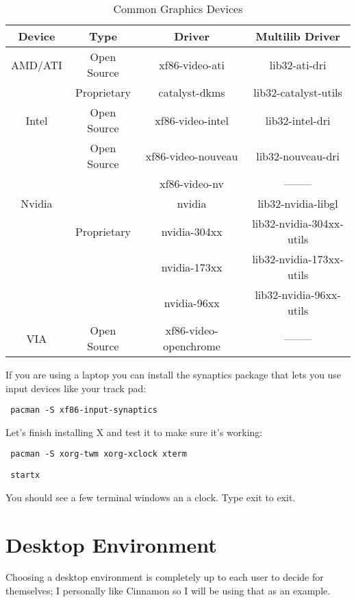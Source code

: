\documentclass[12pt]{article}
\begin{document}
    \begin{table}[H]
        \centering
        \caption{Common Graphics Devices}
        \label{graphics_drivers}
        \begin{tabular}{|c|c|c|c|} \hline
            Device & Type & Driver & Multilib Driver \\ \hline
            AMD/ATI & Open Source & xf86-video-ati & lib32-ati-dri \\ \cline{2-4}
             & Proprietary & catalyst-dkms & lib32-catalyst-utils \\ \cline{2-4} \hline

            Intel & Open Source & xf86-video-intel & lib32-intel-dri \\ \cline{2-4} \hline

            & Open Source & xf86-video-nouveau & lib32-nouveau-dri \\ \cline{3-4}
                    & & xf86-video-nv & -------- \\ \cline{2-4}

            Nvidia & & nvidia & lib32-nvidia-libgl \\ \cline{3-4}
            & Proprietary & nvidia-304xx & lib32-nvidia-304xx-utils \\ \cline{3-4}
            & & nvidia-173xx & lib32-nvidia-173xx-utils \\ \cline{3-4}
            & & nvidia-96xx & lib32-nvidia-96xx-utils \\ \cline{3-4} \hline
            VIA & Open Source & xf86-video-openchrome & -------- \\ \hline
        \end{tabular}
    \end{table}

    If you are using a laptop you can install the synaptics package that lets
    you use input devices like your track pad:
    \begin{verbatim} pacman -S xf86-input-synaptics \end{verbatim}
    Let's finish installing X and test it to make sure it's working:
    \begin{verbatim} pacman -S xorg-twm xorg-xclock xterm \end{verbatim}
    \begin{verbatim} startx \end{verbatim}
    You should see a few terminal windows an a clock. Type exit to exit.

\section*{Desktop Environment}
    Choosing a desktop environment is completely up to each user to decide
    for themselves; I personally like Cinnamon so I will be using that as an
    example.
\end{document}
